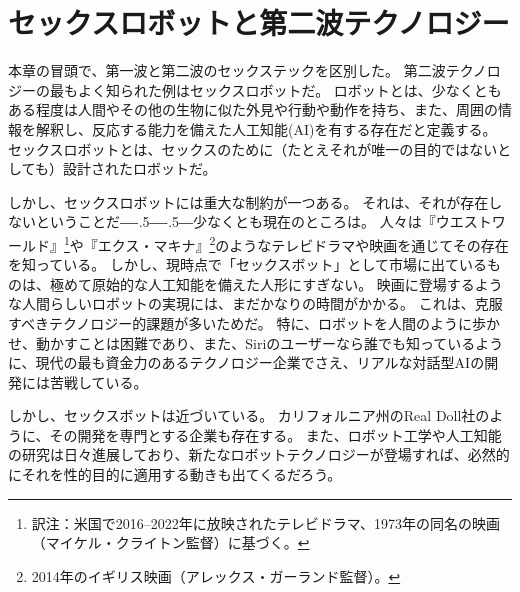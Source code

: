 \documentclass[paper=a4,book,openany]{jlreq}
\def\DDASH{―\kern-.5\zw―\kern-.5\zw―} %
\begin{document}
\section{セックスロボットと第二波テクノロジー}

本章の冒頭で、第一波と第二波のセックステックを区別した。
第二波テクノロジーの最もよく知られた例はセックスロボットだ。
ロボットとは、少なくともある程度は人間やその他の生物に似た外見や行動や動作を持ち、また、周囲の情報を解釈し、反応する能力を備えた人工知能(AI)を有する存在だと定義する\citep{danaher17:_shoul_we_be_think_sex_robot}。
セックスロボットとは、セックスのために（たとえそれが唯一の目的ではないとしても）設計されたロボットだ。

しかし、セックスロボットには重大な制約が一つある。
それは、それが存在しないということだ{\DDASH}少なくとも現在のところは。
人々は『ウエストワールド』\footnote{訳注：米国で2016--2022年に放映されたテレビドラマ、1973年の同名の映画（マイケル・クライトン監督）に基づく。}や『エクス・マキナ』\footnote{2014年のイギリス映画（アレックス・ガーランド監督）。}のようなテレビドラマや映画を通じてその存在を知っている。
しかし、現時点で「セックスボット」として市場に出ているものは、極めて原始的な人工知能を備えた人形にすぎない。
映画に登場するような人間らしいロボットの実現には、まだかなりの時間がかかる。
これは、克服すべきテクノロジー的課題が多いためだ。
特に、ロボットを人間のように歩かせ、動かすことは困難であり、また、Siriのユーザーなら誰でも知っているように、現代の最も資金力のあるテクノロジー企業でさえ、リアルな対話型AIの開発には苦戦している。

しかし、セックスボットは近づいている。
カリフォルニア州のReal Doll社のように、その開発を専門とする企業も存在する。
また、ロボット工学や人工知能の研究は日々進展しており、新たなロボットテクノロジーが登場すれば、必然的にそれを性的目的に適用する動きも出てくるだろう。
\end{document}
